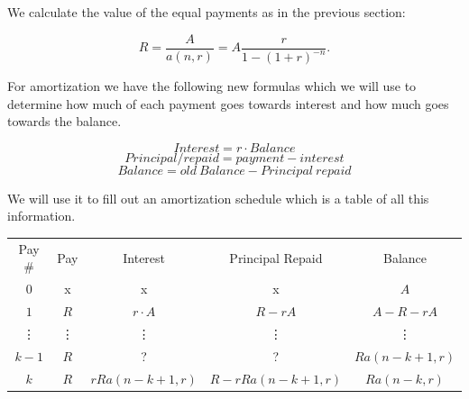 We calculate the value of the equal payments as in the previous section:

\[R = \frac{A}{a\left(n,r\right)} = A\frac{r}{1-(1+r)^{-n}}.\]

For amortization we have the following new formulas which we will use to determine how much of each payment goes towards interest and how much goes towards the balance.

\[Interest = r\cdot Balance\]
\[Principal / repaid = payment - interest\]
\[Balance = old \ Balance - Principal \ repaid\]

We will use it to fill out an amortization schedule which is a table of all this information.

\begin{table}[]
    \centering
    \begin{tabular}{c|c|c|c|c}
         Pay \# & Pay & Interest & Principal Repaid & Balance\\
         \(0\) & x & x & x & \(A\) \\
         \(1\) & \(R\) & \(r\cdot A\) & \(R -rA\) & \(A - R -rA\) \\
         \vdots & \vdots & \vdots & \vdots & \vdots\\
         \(k - 1\) & \(R\) & ?  & ? & \(Ra\left(n-k+1,r\right)\) \\
         \(k\) & \(R\) & \(rRa\left(n-k+1,r\right)\) & \(R - rRa\left(n-k+1,r\right)\)  & \(Ra\left(n-k,r\right)\)
    \end{tabular}

\end{table}